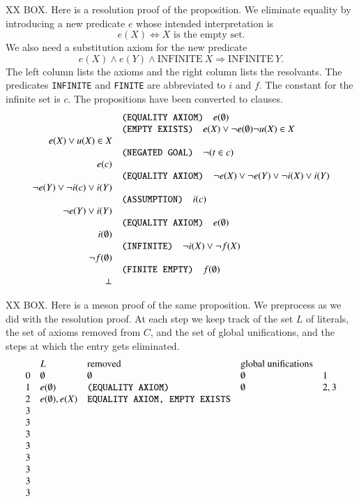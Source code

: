 \documentclass{llncs}
\begin{document}
XX BOX.
Here is a resolution proof of the proposition.  We eliminate equality by
introducing a new predicate $e$ whose intended interpretation is 
\[
e(X) \Leftrightarrow X \text{~is the empty set.}
\]
We also need a substitution axiom for the new predicate
\[
e(X) \land e(Y) \land \text{INFINITE}~X \Longrightarrow \text{INFINITE}~Y.
\]
The left column lists the axioms and the right column lists the resolvants.
The predicates {\tt INFINITE} and {\tt FINITE} are abbreviated to $i$ and $f$.
The constant for the infinite set is $c$. The propositions have been converted
to clauses.
\[
\begin{array}{rl}
&\text{\tt(EQUALITY AXIOM)}\quad e(\emptyset)\\
&\text{\tt(EMPTY EXISTS)}\quad e(X) \lor \lnot e(\emptyset) \lnot u(X)\in X\\
e(X) \lor u(X)\in X &\\
&\text{\tt(NEGATED GOAL)}\quad\lnot (t\in c)\\
e(c)&\\
&\text{\tt(EQUALITY AXIOM)}\quad\lnot e(X) \lor \lnot e(Y) \lor \lnot i(X) \lor i(Y) \\
 \lnot e(Y) \lor \lnot i(c) \lor  i(Y)&\\
&\text{\tt(ASSUMPTION)}\quad i(c) \\
\lnot e(Y) \lor i(Y)&\\
&\text{\tt (EQUALITY AXIOM)}\quad e(\emptyset) \\
i(\emptyset) &\\
&\text{\tt (INFINITE)}\quad \lnot i(X) \lor \lnot f(X)\\
\lnot f(\emptyset) &\\
&\text{\tt (FINITE EMPTY)}\quad f(\emptyset)\\
\perp
\end{array}
\]

XX BOX.
Here is a meson proof of the same proposition.  We preprocess as we did
with the resolution proof. At each step we keep track of the set $L$ of literals, the
set of axioms removed from $C$, and the set of global unifications, and the
steps at which the entry gets eliminated.
\[
\begin{array}{lllll}
& L & \text{removed} & \text{global unifications}\\
0&\emptyset & \emptyset & \emptyset & 1\\
1&e(\emptyset) & \text{\tt(EQUALITY AXIOM)} & \emptyset & 2,3 \\
2&e(\emptyset), e(X) & \text{\tt EQUALITY AXIOM, EMPTY EXISTS} & \\ 
3& & & \\
3& & & \\
3& & & \\
3& & & \\
3& & & \\
3& & & \\
3& & & \\
3& & & 
\end{array}
\]
\end{document}
